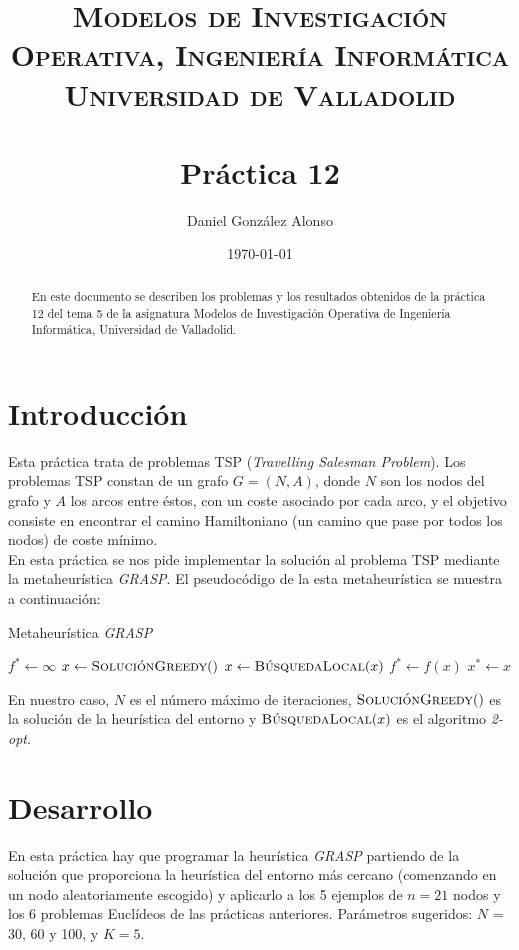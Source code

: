 \documentclass[a4paper,11pt]{article}
\title{
	\vspace{-25pt}
	\normalfont \Large \textsc{
		Modelos de Investigación Operativa,
        Ingeniería Informática\\
        Universidad de Valladolid
	}\\[10pt]
	\horrule{1pt}\\[10pt]
	\huge \textbf{
		Práctica 12
	}\\
	\horrule{1pt}
}
\author{
	\normalfont \Large Daniel González Alonso
}
\date{
	\normalfont \large \today
}
\let\oldReturn\Return
\renewcommand{\Return}{\State\oldReturn}
\begin{document}
\maketitle

\begin{abstract}
	En este documento se describen los problemas y los resultados obtenidos de la práctica 12 del tema 5 de la asignatura Modelos de Investigación Operativa de Ingeniería Informática, Universidad de Valladolid.
\end{abstract}

\section{Introducción}
Esta práctica trata de problemas TSP (\textit{Travelling Salesman Problem}). Los problemas TSP constan de un grafo ${G=(N,A)}$, donde ${N}$ son los nodos del grafo y ${A}$ los arcos entre éstos, con un coste asociado por cada arco, y el objetivo consiste en encontrar el camino Hamiltoniano (un camino que pase por todos los nodos) de coste mínimo.\\

En esta práctica se nos pide implementar la solución al problema TSP mediante la metaheurística \textit{GRASP}. El pseudocódigo de la esta metaheurística se muestra a continuación:

\begin{algorithm}[!htbp]
\caption{Metaheurística \textit{GRASP}}
\label{alg_grasp}
\begin{algorithmic}[1]
    \State ${f^{\ast} \gets \infty}$
        \State ${x \gets \Call{SoluciónGreedy}{\null}}$
        \State ${x \gets \Call{BúsquedaLocal}{x}}$
            \State ${f^{\ast} \gets f(x)}$
            \State ${x^{\ast} \gets x}$
        \EndIf
    \EndFor
\EndFunction
\end{algorithmic}
\end{algorithm}

En nuestro caso, ${N}$ es el número máximo de iteraciones, ${\Call{SoluciónGreedy}{\null}}$ es la solución de la heurística del entorno y ${\Call{BúsquedaLocal}{x}}$ es el algoritmo \textit{2-opt}.

\newpage
\section{Desarrollo}
En esta práctica hay que programar la heurística \textit{GRASP} partiendo de la solución que proporciona la heurística del entorno más cercano (comenzando en un nodo aleatoriamente escogido) y aplicarlo a los 5 ejemplos de ${n=21}$ nodos y los 6 problemas Euclídeos de las prácticas anteriores. Parámetros sugeridos: ${N}$ = 30, 60 y 100, y ${K = 5}$.\\
\end{document}
